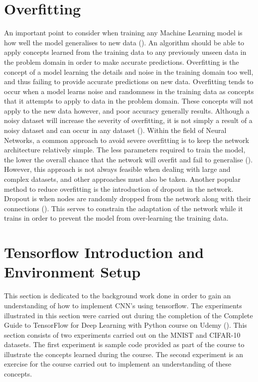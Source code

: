\documentclass[12pt]{report}
\begin{document}
\section{Overfitting}
\begin{flushleft}
An important point to consider when training any Machine Learning model is how well the model generalises to new data (\cite{domingos2012few}). An algorithm should be able to apply concepts learned from the training data to any previously unseen data in the problem domain in order to make accurate predictions. Overfitting is the concept of a model learning the details and noise in the training domain too well, and thus failing to provide accurate predictions on new data. Overfitting tends to occur when a model learns noise and randomness in the training data as concepts that it attempts to apply to data in the problem domain. These concepts will not apply to the new data however, and poor accuracy generally results. Although a noisy dataset will increase the severity of overfitting, it is not simply a result of a noisy dataset and can occur in any dataset (\cite{domingos2012few}). Within the field of Neural Networks, a common approach to avoid severe overfitting is to keep the network architecture relatively simple. The less parameters required to train the model, the lower the overall chance that the network will overfit and fail to generalise (\cite{o2015introduction}). However, this approach is not always feasible when dealing with large and complex datasets, and other approaches must also be taken. Another popular method to reduce overfitting is the introduction of dropout in the network. Dropout is when nodes are randomly dropped from the network along with their connections (\cite{srivastava2014dropout}). This serves to constrain the adaptation of the network while it trains in order to prevent the model from over-learning the training data.
\end{flushleft}

\section{Tensorflow Introduction and Environment Setup}

This section is dedicated to the background work done in order to gain an understanding of how to implement CNN's using tensorflow. The experiments illustrated in this section were carried out during the completion of the Complete Guide to TensorFlow for Deep Learning with Python course on Udemy (\cite{udemy}). This section consists of two experiments carried out on the MNIST and CIFAR-10 datasets. The first experiment is sample code provided as part of the course to illustrate the concepts learned during the course. The second experiment is an exercise for the course carried out to implement an understanding of these concepts.
\end{document}

